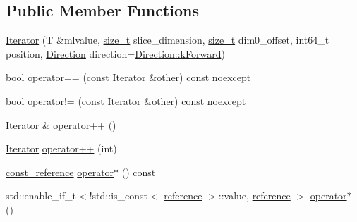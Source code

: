 \subsection*{Public Member Functions}
\begin{DoxyCompactItemize}
\item 
\mbox{\hyperlink{classonnxruntime_1_1MLValueTensorSlicer_1_1Iterator_a3cf3c5e88a712753ab3c0d7a728fa0df}{Iterator}} (T \&mlvalue, \mbox{\hyperlink{mlasi_8h_a503efbc1c6e50825320ad909366b78ab}{size\+\_\+t}} slice\+\_\+dimension, \mbox{\hyperlink{mlasi_8h_a503efbc1c6e50825320ad909366b78ab}{size\+\_\+t}} dim0\+\_\+offset, int64\+\_\+t position, \mbox{\hyperlink{classonnxruntime_1_1MLValueTensorSlicer_1_1Iterator_ad83ea2768d16fdaead62f58e6190a0c1}{Direction}} direction=\mbox{\hyperlink{classonnxruntime_1_1MLValueTensorSlicer_1_1Iterator_ad83ea2768d16fdaead62f58e6190a0c1ae7c3602dce09c755e09250077a601a51}{Direction\+::k\+Forward}})
\item 
bool \mbox{\hyperlink{classonnxruntime_1_1MLValueTensorSlicer_1_1Iterator_a6aea224055665bfbb5f538060a4cdd75}{operator==}} (const \mbox{\hyperlink{classonnxruntime_1_1MLValueTensorSlicer_1_1Iterator}{Iterator}} \&other) const noexcept
\item 
bool \mbox{\hyperlink{classonnxruntime_1_1MLValueTensorSlicer_1_1Iterator_a091b61988d4a78e6fb3f8d9b1de7d468}{operator!=}} (const \mbox{\hyperlink{classonnxruntime_1_1MLValueTensorSlicer_1_1Iterator}{Iterator}} \&other) const noexcept
\item 
\mbox{\hyperlink{classonnxruntime_1_1MLValueTensorSlicer_1_1Iterator}{Iterator}} \& \mbox{\hyperlink{classonnxruntime_1_1MLValueTensorSlicer_1_1Iterator_a172403b59d8c520d0d9f5515e4188ba0}{operator++}} ()
\item 
\mbox{\hyperlink{classonnxruntime_1_1MLValueTensorSlicer_1_1Iterator}{Iterator}} \mbox{\hyperlink{classonnxruntime_1_1MLValueTensorSlicer_1_1Iterator_ac751c6e41f9d708d7e5d73223c53ee99}{operator++}} (int)
\item 
\mbox{\hyperlink{classonnxruntime_1_1MLValueTensorSlicer_1_1Iterator_aafbb938cecd84d85c4eef5b9e4332873}{const\+\_\+reference}} \mbox{\hyperlink{classonnxruntime_1_1MLValueTensorSlicer_1_1Iterator_a64da46bb41ce7eca8e644e31890507c4}{operator$\ast$}} () const
\item 
std\+::enable\+\_\+if\+\_\+t$<$!std\+::is\+\_\+const$<$ \mbox{\hyperlink{classonnxruntime_1_1MLValueTensorSlicer_1_1Iterator_a528f0b8364b23168f0565c1503b44cd0}{reference}} $>$\+::value, \mbox{\hyperlink{classonnxruntime_1_1MLValueTensorSlicer_1_1Iterator_a528f0b8364b23168f0565c1503b44cd0}{reference}} $>$ \mbox{\hyperlink{classonnxruntime_1_1MLValueTensorSlicer_1_1Iterator_a84eeddda16f4d2a08e1ea2bd005ce905}{operator$\ast$}} ()
\end{DoxyCompactItemize}


